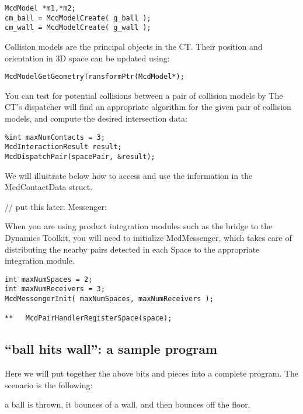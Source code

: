 \documentclass[11pt]{article}
\newcommand{\minisection}[1]{\noindent{\bf{#1}}}
\begin{document}
\begin{verbatim}
McdModel *m1,*m2;
cm_ball = McdModelCreate( g_ball );
cm_wall = McdModelCreate( g_wall );
\end{verbatim}

Collision models are the principal objects in the CT.
Their position and orientation in 3D space can be updated using:

\begin{verbatim}
McdModelGetGeometryTransformPtr(McdModel*);
\end{verbatim}

\minisection{Intersect:}

You can test for potential collisions between a pair of collision models by 
The CT's dispatcher will find an appropriate algorithm for the given pair
of collision models, and compute the desired intersection data:

\begin{verbatim}
%int maxNumContacts = 3;
McdInteractionResult result;
McdDispatchPair(spacePair, &result);
\end{verbatim}

%

We will illustrate below how to access and use the information in the
McdContactData struct.


// put this later:
Messenger:

When you are using product integration modules such as the bridge to the
Dynamics Toolkit, you will need to initialize McdMessenger, which takes
care of distributing the nearby pairs detected in each Space to the
appropriate integration module.
\begin{verbatim}
int maxNumSpaces = 2;
int maxNumReceivers = 3;
McdMessengerInit( maxNumSpaces, maxNumReceivers );

**   McdPairHandlerRegisterSpace(space);
\end{verbatim}


\subsection{ ``ball hits wall'': a sample program }

Here we will put together the above bits and pieces into a complete
program. The scenario is the following:

a ball is thrown, it bounces
of a wall, and then bounces off the floor.
\end{document}
